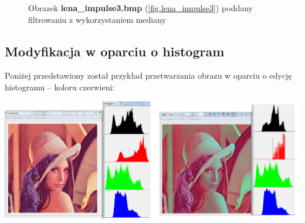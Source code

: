 \documentclass{classrep}
\begin{document}
\begin{figure}
{{  \label{fig.lena_impulse3_median_5x5}
 }
}
\caption{Obrazek \textbf{lena\_impulse3.bmp} (\ref{fig.lena_impulse3}) poddany filtrowaniu z wykorzystaniem mediany}
\label{fig.lena_impulse3_median}
\end{figure}

\subsection{Modyfikacja w oparciu o histogram}
Poniżej przedstawiony został przykład przetwarzania obrazu w oparciu o edycję histogramu – koloru czerwieni:

  \includegraphics[scale=0.25]{img/lenna_hist.jpg}
\end{document}
